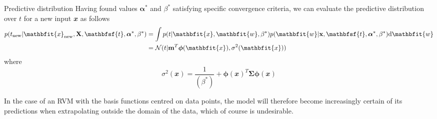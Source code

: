 \documentclass{bredelebeamer}
\begin{document}
\begin{frame}{Predictive distribution}
  Having found values $\boldsymbol{\alpha}^*$ and $\beta^*$ satisfying specific
  convergence criteria, we can evaluate the predictive distribution over $t$
  for a new input $\mathbfit{x}$ as follows
  \begin{equation}
    \begin{split}
      p(t_{\textrm{new}} | \mathbfit{x}_{\textrm{new}}, \mathbf{X}, \mathbfsf{t}, \boldsymbol{\alpha}^*, \beta^*)
      &= \int p(t|\mathbfit{x}, \mathbfit{w}, \beta^*) p(\mathbfit{w} | \mathbf{x}, \mathbfsf{t}, \boldsymbol{\alpha}^*, \beta^*) \mathrm{d}\mathbfit{w} \\
      &= \mathcal{N} (t | \mathbf{m}^T \boldsymbol{\phi}(\mathbfit{x}), \sigma^2(\mathbfit{x}))
    \end{split}
  \end{equation}
  where
  \begin{equation}
    \sigma^2(\mathbfit{x}) = \frac{1}{(\beta^*)} + {\boldsymbol{\phi}(\mathbfit{x})}^T \boldsymbol{\Sigma} \boldsymbol{\phi}(\mathbfit{x})
  \end{equation}

  In the case of an RVM with the basis functions centred on data points, the model
  will therefore become increasingly certain of its predictions when extrapolating
  outside the domain of the data, which of course is undesirable.
\end{frame}
\end{document}
